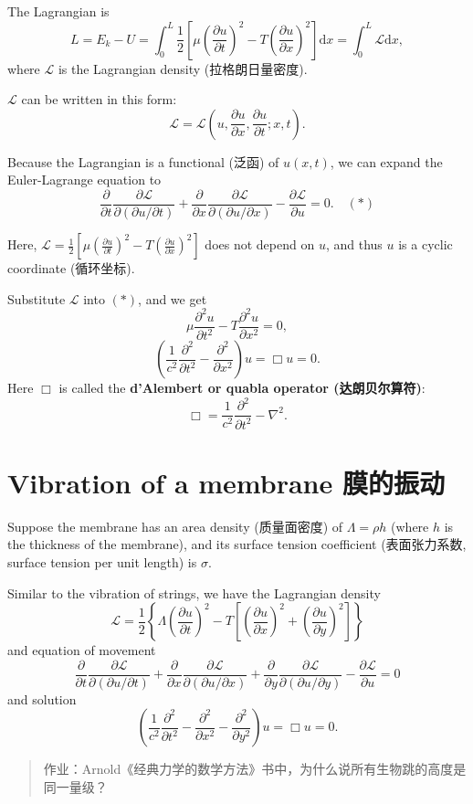 The Lagrangian is
\[L = E_k - U = \int_{0}^{L} \frac{1}{2} \left[ \mu \left( \frac{\partial u}{\partial t} \right)^2 - T \left( \frac{\partial u}{\partial x} \right)^2 \right] \mathrm{d}x = \int_{0}^{L} \mathcal{L} \mathrm{d}x,\]
where \(\mathcal{L}\) is the Lagrangian density (拉格朗日量密度).

\(\mathcal{L}\) can be written in this form:
\[\mathcal{L} = \mathcal{L} \left( u, \frac{\partial u}{\partial x}, \frac{\partial u}{\partial t}; x, t \right).\]

Because the Lagrangian is a functional (泛函) of \(u(x, t)\), we can
expand the Euler-Lagrange equation to
\[\frac{\partial}{\partial t} \frac{\partial \mathcal{L}}{\partial (\partial u / \partial t)} + \frac{\partial}{\partial x} \frac{\partial \mathcal{L}}{\partial (\partial u / \partial x)} - \frac{\partial \mathcal{L}}{\partial u} = 0. \quad(*)\]

Here,
\(\displaystyle \mathcal{L} = \frac{1}{2} \left[ \mu \left( \frac{\partial u}{\partial t} \right)^2 - T \left( \frac{\partial u}{\partial x} \right)^2 \right]\)
does not depend on \(u\), and thus \(u\) is a cyclic coordinate
(循环坐标).

Substitute \(\mathcal{L}\) into \((*)\), and we get
\[\mu \frac{\partial^2 u}{\partial t^2} - T \frac{\partial^2 u}{\partial x^2} = 0,\]
\[\left( \frac{1}{c^2} \frac{\partial^2}{\partial t^2} - \frac{\partial^2}{\partial x^2} \right) u = \Box u = 0.\]
Here \(\Box\) is called the \textbf{d'Alembert or quabla operator
(达朗贝尔算符)}:
\[\Box = \frac{1}{c^2} \frac{\partial^2}{\partial t^2}- \nabla^2.\]

\section{Vibration of a membrane
膜的振动}\label{vibration-of-a-membrane-ux819cux7684ux632fux52a8}

Suppose the membrane has an area density (质量面密度) of
\(\varLambda = \rho h\) (where \(h\) is the thickness of the membrane),
and its surface tension coefficient (表面张力系数, surface tension per
unit length) is \(\sigma\).

Similar to the vibration of strings, we have the Lagrangian density
\[\mathcal{L} = \frac{1}{2} \left\{ \varLambda \left( \frac{\partial u}{\partial t} \right)^2 - T \left[ \left( \frac{\partial u}{\partial x} \right)^2 + \left( \frac{\partial u}{\partial y} \right)^2 \right] \right\}\]
and equation of movement
\[\frac{\partial}{\partial t} \frac{\partial \mathcal{L}}{\partial (\partial u / \partial t)} + \frac{\partial}{\partial x} \frac{\partial \mathcal{L}}{\partial (\partial u / \partial x)} + \frac{\partial}{\partial y} \frac{\partial \mathcal{L}}{\partial (\partial u / \partial y)} - \frac{\partial \mathcal{L}}{\partial u} = 0\]
and solution
\[\left( \frac{1}{c^2} \frac{\partial^2}{\partial t^2} - \frac{\partial^2}{\partial x^2} - \frac{\partial^2}{\partial y^2} \right) u = \Box u = 0.\]

\begin{quote}
作业：Arnold《经典力学的数学方法》书中，为什么说所有生物跳的高度是同一量级？
\end{quote}
